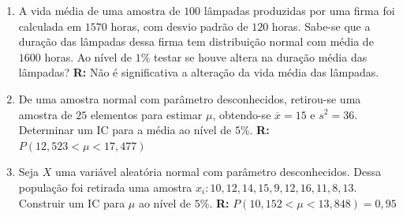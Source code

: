 \documentclass[oneside,a4paper,12pt]{article}
\begin{document}
\begin{enumerate}
	\item A vida média de uma amostra de $100$ lâmpadas produzidas por uma firma foi calculada em $1570$ horas, com desvio padrão de $120$ horas. Sabe-se que a duração das lâmpadas dessa firma tem distribuição normal com média de $1600$ horas. Ao nível de $1$\% testar se houve altera na duração média das lâmpadas? {\bf R: } Não é significativa a alteração da vida média das lâmpadas.

	\item De uma amostra normal com parâmetro desconhecidos, retirou-se uma amostra de $25$ elementos para estimar $\mu$, obtendo-se $\overline{x} = 15$ e $s^2 = 36$. Determinar um IC para a média ao nível de $5$\%. {\bf R: } $P(12,523 < \mu < 17,477)$

	\item Seja $X$ uma variável aleatória normal com parâmetro desconhecidos. Dessa população foi retirada uma amostra $x_i : 10,12,14,15,9,12,16,11,8,13$. Construir um IC para $\mu$ ao nível de $5$\%. {\bf R: } $P(10,152 < \mu < 13,848) = 0,95$
	
	

\end{enumerate}


	
\end{document}
